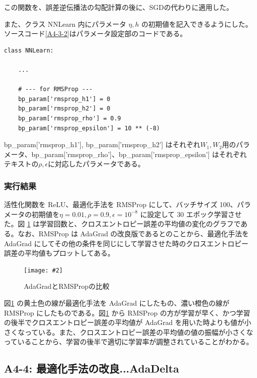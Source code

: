 \documentclass[a4paper,dvipdfmx]{jsarticle}
\newcommand{\image}[3]{
    \begin{figure}[H]
        \begin{center}
        \texttt{[image: \#2]}
        \end{center}
        \caption{#1}
        \label{#3}
    \end{figure}
}
\begin{document}
この関数を、誤差逆伝播法の勾配計算の後に、SGDの代わりに適用した。

また、クラス NNLearn 内にパラメータ $\eta, h$ の初期値を記入できるようにした。ソースコード\ref{A4-3-2}はパラメータ設定部のコードである。
\begin{lstlisting}[caption="RMSProp のパラメータ設定部",label=A4-3-2]
class NNLearn:

	...
	
    # --- for RMSProp ---
    bp_param['rmsprop_h1'] = 0
    bp_param['rmsprop_h2'] = 0
    bp_param['rmsprop_rho'] = 0.9
    bp_param['rmsprop_epsilon'] = 10 ** (-8)
\end{lstlisting}

bp\_param['rmsprop\_h1'], bp\_param['rmsprop\_h2'] はそれぞれ$W_1, W_2$用のパラメータ、bp\_param['rmsprop\_rho']、bp\_param['rmsprop\_epsilon'] はそれぞれテキストの$\rho, \epsilon$に対応したパラメータである。

\subsubsection*{実行結果}

活性化関数を ReLU、最適化手法を RMSProp にして、バッチサイズ 100、パラメータの初期値を$\eta = 0.01, \rho = 0.9, \epsilon = 10^{-8}$ に設定して 30 エポック学習させた。図 \ref{fig-A4-3-1} は学習回数と、クロスエントロピー誤差の平均値の変化のグラフである。なお、RMSProp は AdaGrad の改良版であるとのことから、最適化手法を AdaGrad にしてその他の条件を同じにして学習させた時のクロスエントロピー誤差の平均値もプロットしてある。

\image{AdaGradとRMSPropの比較}{report_a4-3.png}{fig-A4-3-1}

図\ref{fig-A4-3-1} の黄土色の線が最適化手法を AdaGrad にしたもの、濃い橙色の線が RMSProp にしたものである。図\ref{fig-A4-3-1} から RMSProp の方が学習が早く、かつ学習の後半でクロスエントロピー誤差の平均値が AdaGrad を用いた時よりも値が小さくなっている。また、クロスエントロピー誤差の平均値の値の振幅が小さくなっていることから、学習の後半で適切に学習率が調整されていることがわかる。

\subsection*{A4-4: 最適化手法の改良...AdaDelta}
\end{document}
